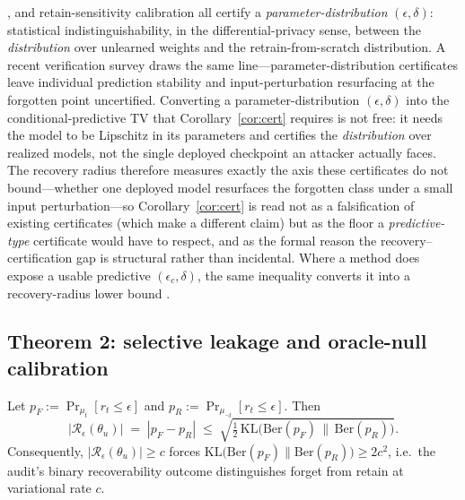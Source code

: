 \cite{koloskova2025certified}, and retain-sensitivity calibration
\cite{heinzler2026retain} all certify a \emph{parameter-distribution}
$(\epsilon,\delta)$: statistical indistinguishability, in the
differential-privacy sense, between the \emph{distribution} over unlearned
weights and the retrain-from-scratch distribution. A recent verification survey
\cite{xue2026survey} draws the same line---parameter-distribution certificates
leave individual prediction stability and input-perturbation resurfacing at the
forgotten point uncertified. Converting a parameter-distribution
$(\epsilon,\delta)$ into the conditional-predictive TV that
Corollary~\ref{cor:cert} requires is not free: it needs the model to be
Lipschitz in its parameters and certifies the \emph{distribution} over realized
models, not the single deployed checkpoint an attacker actually faces. The
recovery radius therefore measures exactly the axis these certificates do not
bound---whether one deployed model resurfaces the forgotten class under a small
input perturbation---so Corollary~\ref{cor:cert} is read not as a falsification
of existing certificates (which make a different claim) but as the floor a
\emph{predictive-type} certificate would have to respect, and as the formal
reason the recovery--certification gap is structural rather than incidental.
Where a method does expose a usable predictive $(\epsilon_c,\delta)$, the same
inequality converts it into a recovery-radius lower bound
\cite{chien2024langevin,hsu2025rurk,yu2025impossibility,heinzler2026retain}.

\subsection{Theorem 2: selective leakage and oracle-null calibration}
\label{sec:thm2}

\begin{theorem}
\label{thm:pinsker}
Let $p_F := \Pr_{\mu_t}[r_t \leq \epsilon]$ and
$p_R := \Pr_{\mu_{\neg t}}[r_t \leq \epsilon]$. Then
\begin{equation}
  |\mathcal{R}_\epsilon(\theta_u)| \;=\; |p_F - p_R|
  \;\leq\; \sqrt{\tfrac{1}{2}\,
   \mathrm{KL}\bigl(\mathrm{Ber}(p_F)\,\|\,\mathrm{Ber}(p_R)\bigr)}.
\end{equation}
Consequently, $|\mathcal{R}_\epsilon(\theta_u)| \geq c$ forces
$\mathrm{KL}\bigl(\mathrm{Ber}(p_F)\|\mathrm{Ber}(p_R)\bigr) \geq 2c^2$,
i.e.\ the audit's binary recoverability outcome distinguishes forget from
retain at variational rate $c$.
\end{theorem}


